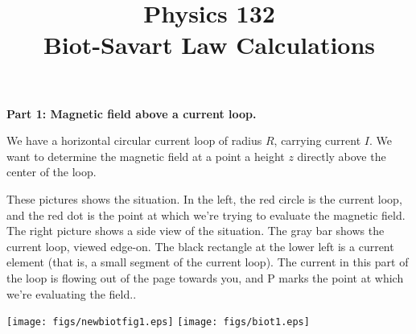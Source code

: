\documentclass{article}
\begin{document}
\title{Physics 132\\
Biot-Savart Law Calculations}
\maketitle


\bigskip\bigskip


{\bf Part 1: Magnetic field above a current loop.}

We have a horizontal 
circular current loop of radius $R$, carrying
current $I$.  We want to determine the magnetic field at a point a
height $z$ directly above the center of the loop.

These pictures shows the situation.  In the left,
the red circle is the current loop, and the red dot is the point at
which we're trying to evaluate the magnetic field.
The right picture shows a side view of the situation. The
gray bar shows the current loop, viewed edge-on.
The black rectangle
at the lower left is a current element (that is, a small segment of 
the current loop).  The current in this part of the loop is flowing
out of the page towards you, and P marks the point at which we're
evaluating the field..

\vskip 0.7in
\centerline{\texttt{[image: figs/newbiotfig1.eps]}\hfil
\texttt{[image: figs/biot1.eps]}}
\medskip
\end{document}
